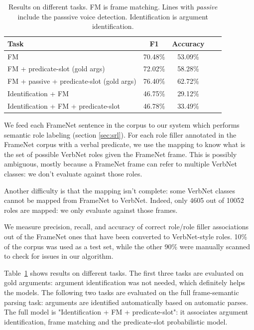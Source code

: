 \begin{table}[t!]
    \centering
    \begin{tabular}{lcccc}
        \toprule
        Task                                           & F1        & Accuracy \\
        \midrule
        FM                                             & 70.48\%   & 53.09\%  \\
        FM + predicate-slot (gold args)                & 72.02\%   & 58.28\%  \\
        FM + passive + predicate-slot (gold args)      & 76.40\%   & 62.72\%  \\
        \midrule
        Identification + FM                            & 46.75\%   & 29.12\%  \\
        Identification + FM + predicate-slot           & 46.78\%   & 33.49\%  \\
        \bottomrule
    \end{tabular}
    \caption{\protect\centering\label{table:results}Results on different tasks. FM is frame matching. Lines with \emph{passive} include the passsive voice detection. Identification is argument identification.}
\end{table}

We feed each FrameNet sentence in the corpus to our system which performs
semantic role labeling (section \ref{sec:srl}). For each role filler annotated
in the FrameNet corpus with a verbal predicate, we use the mapping to know what
is the set of possible VerbNet roles given the FrameNet frame. This is possibly
ambiguous, mostly because a FrameNet frame can refer to multiple VerbNet
classes: we don't evaluate against those roles.

Another difficulty is that the mapping isn't complete: some VerbNet classes
cannot be mapped from FrameNet to VerbNet. Indeed, only 4605 out of 10052 roles
are mapped: we only evaluate against those frames.

We measure precision, recall, and accuracy of correct role/role filler
associations out of the FrameNet ones that have been converted to VerbNet-style
roles. 10\% of the corpus was used as a test set, while the other 90\% were
manually scanned to check for issues in our algorithm.

Table~\ref{table:results} shows results on different tasks. The first three
tasks are evaluated on gold arguments: argument identification was not needed, which
definitely helps the models. The following two tasks are evaluated on the full
frame-semantic parsing task: arguments are identified automatically based on
automatic parses. The full model is "Identification + FM + predicate-slot": it
associates argument identification, frame matching and the predicate-slot
probabilistic model.

